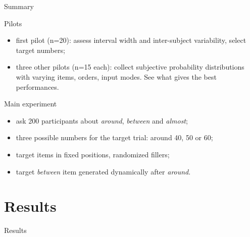 \documentclass[xcolor=table, hyperref={pdfpagelabels=false}]{beamer}
\begin{document}
\begin{frame}{Summary}
\begin{block}{Pilots}
	\begin{itemize}
		\item first pilot (n=20): assess interval width and inter-subject variability, select target numbers; \pause
		\item three other pilots (n=15 each): collect subjective probability distributions with varying items, orders, input modes. See what gives the best performances.
	\end{itemize}
\end{block} \pause
\begin{block}{Main experiment}
	\begin{itemize}
		\item ask 200 participants about \textit{around}, \textit{between} and \textit{almost}; \pause
		\item three possible numbers for the target trial: around 40, 50 or 60; \pause
		\item target items in fixed positions, randomized fillers; \pause
		\item target \textit{between} item generated dynamically after \textit{around}.
	\end{itemize}
\end{block}
\end{frame}
\section{Results}
\begin{frame}{}
\begin{center}
	\Huge Results
\end{center}
\end{frame}
\end{document}
